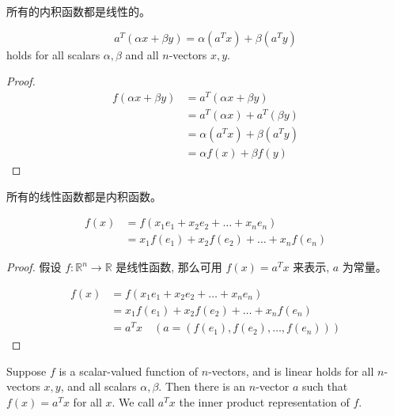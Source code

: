 \begin{theorem}
    所有的内积函数都是线性的。

    $$
a^{T}(\alpha x+\beta y)=\alpha\left(a^{T} x\right)+\beta\left(a^{T} y\right)
$$
holds for all scalars $ \alpha, \beta $ and all $ n $-vectors $ x, y $.
\end{theorem}

\begin{proof}
    $$ \begin{aligned} f(\alpha x+\beta y) &=a^{T}(\alpha x+\beta y) \\ &=a^{T}(\alpha x)+a^{T}(\beta y) \\ &=\alpha\left(a^{T} x\right)+\beta\left(a^{T} y\right) \\ &=\alpha f(x)+\beta f(y) \end{aligned} $$
\end{proof}


\begin{theorem}
    所有的线性函数都是内积函数。

    $$ \begin{aligned} f(x) &=f\left(x_{1} e_{1}+x_{2} e_{2}+\ldots+x_{n} e_{n}\right) \\ &=x_{1} f\left(e_{1}\right)+x_{2} f\left(e_{2}\right)+\ldots+x_{n} f\left(e_{n}\right) \end{aligned} $$
\end{theorem}

\begin{proof}
    假设 $ f: \mathbb{R}^{n} \rightarrow \mathbb{R} $ 是线性函数, 那么可用 $ f(x)=a^{T} x $ 来表示, $ a $ 为常量。

    $$ \begin{aligned} f(x) &=f\left(x_{1} e_{1}+x_{2} e_{2}+\ldots+x_{n} e_{n}\right) \\ &=x_{1} f\left(e_{1}\right)+x_{2} f\left(e_{2}\right)+\ldots+x_{n} f\left(e_{n}\right) \\ & = a^Tx \quad (a = ( f\left(e_{1}\right), f\left(e_{2}\right), \ldots, f\left(e_{n}\right) )) \end{aligned} $$
\end{proof}

\begin{definition}
    Suppose $ f $ is a scalar-valued function of $ n $-vectors, and is linear  holds for all $ n $-vectors $ x, y $, and all scalars $ \alpha, \beta $. Then there is an $ n $-vector $ a $ such that $ f(x)=a^{T} x $ for all $ x $. We call $ a^{T} x $ the inner product representation of $ f $.
\end{definition}

